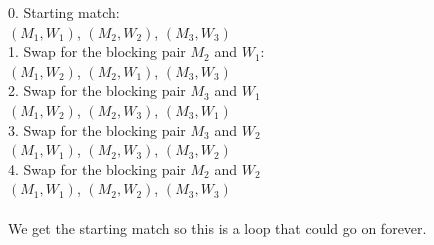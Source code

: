\documentclass[a4paper]{article}
\begin{document}
0. Starting match: \\
$(M_1, W_1)$, $(M_2, W_2)$, $(M_3, W_3)$ \\
1. Swap for the blocking pair $M_2$ and $W_1$: \\
$(M_1, W_2)$, $(M_2, W_1)$, $(M_3, W_3)$ \\
2. Swap for the blocking pair $M_3$ and $W_1$ \\
$(M_1, W_2)$, $(M_2, W_3)$, $(M_3, W_1)$ \\
3. Swap for the blocking pair $M_3$ and $W_2$ \\
$(M_1, W_1)$, $(M_2, W_3)$, $(M_3, W_2)$ \\
4. Swap for the blocking pair $M_2$ and $W_2$ \\
$(M_1, W_1)$, $(M_2, W_2)$, $(M_3, W_3)$ \\
\\
We get the starting match so this is a loop that could go on forever.
\end{document}
